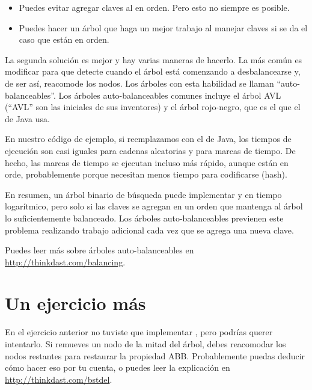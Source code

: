 \documentclass[12pt]{book}
\theoremstyle{exercise}
\begin{document}
\begin{itemize}

\item
  Puedes evitar agregar claves al  en orden. Pero esto
  no siempre es posible.

\item
  Puedes hacer un árbol que haga un mejor trabajo al manejar claves
  si se da el caso que están en orden.

\end{itemize}

La segunda solución es mejor y hay varias maneras de hacerlo. La más
común es modificar  para que detecte cuando el árbol está
comenzando a desbalancearse y, de ser así, reacomode los nodos. Los
árboles con esta habilidad se llaman ``auto-balanceables''. Los árboles
auto-balanceables comunes incluye el árbol AVL (``AVL'' son las iniciales
de sus inventores) y el árbol rojo-negro, que es el que el 
de Java usa.


En nuestro código de ejemplo, si reemplazamos  con el 
 de Java, los tiempos de ejecución son casi iguales para
cadenas aleatorias y para marcas de tiempo. De hecho, las marcas de tiempo
se ejecutan incluso más rápido, aunque están en orde, probablemente porque
necesitan menos tiempo para codificarse (hash).


En resumen, un árbol binario de búsqueda puede implementar  y
 en tiempo logarítmico, pero solo si las claves se agregan en un
orden que mantenga al árbol lo suficientemente balanceado. Los árboles
auto-balanceables previenen este problema realizando trabajo adicional cada
vez que se agrega una nueva clave.

Puedes leer más sobre árboles auto-balanceables en
\url{http://thinkdast.com/balancing}.


\section{Un ejercicio más}
\label{one-more-exercise}

En el ejercicio anterior no tuviste que implementar ,
pero podrías querer intentarlo. Si remueves un nodo de la mitad del
árbol, debes reacomodar los nodos restantes para restaurar la propiedad
ABB. Probablemente puedas deducir cómo hacer eso por tu cuenta, o puedes
leer la explicación en
\url{http://thinkdast.com/bstdel}.
\end{document}
